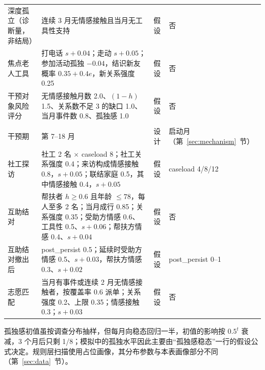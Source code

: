 \documentclass[10.5pt,twocolumn]{ctexart}
\begin{document}
\begin{table}[t]
\begin{tabular}{@{}>{\raggedright\arraybackslash}p{}>{\raggedright\arraybackslash}p{}>{\raggedright\arraybackslash}p{}>{\raggedright\arraybackslash}p{}@{}}
深度孤立（诊断量，非结局） & 连续 3 月无情感接触且当月无工具性支持 & 假设 & 否 \\
焦点老人工具 & 打电话 $s{+}0.04$；走动 $s{+}0.05$；参加活动孤独 $-0.04$，结识新友概率 $0.35+0.4e$，新关系强度 0.25 & 假设 & 否 \\
干预对象风险评分 & 无情感接触月数 2.0、$(1-h)$ 1.5、关系数不足 3 的缺口 1.0、当月事件数 0.8、孤独感 1.0 & 假设 & 否 \\
\midrule
\multicolumn{4}{@{}l}{\textit{干预（方向参照文献，数值为建模选择，见第~\ref{sec:interventions}~节）}} \\
干预期 & 第 7--18 月 & 设计 & 启动月（第~\ref{sec:mechanism}~节） \\
社工探访 & 社工 2 名 $\times$ caseload 8；社工关系强度 0.4；来访构成情感接触 0.8，$s{+}0.05$；联结家庭 0.5，其中情感接触 0.4，$s{+}0.05$ & 假设 & caseload 4/8/12 \\
互助结对 & 帮扶者 $h\ge0.6$ 且年龄 $\le78$，每人至多 2 名；当月成行 0.85；关系强度 0.35；受助方情感 0.6、工具性 0.5、$s{+}0.06$；帮扶方情感 0.4、$s{+}0.04$ & 假设 & 否 \\
互助结对撤出后 & post\_persist 0.5；延续时受助方情感 0.5、$s{+}0.03$，帮扶方情感 0.3、$s{+}0.02$ & 假设 & post\_persist 0--1 \\
志愿匹配 & 当月有事件或连续 2 月无情感接触者，按覆盖率 0.6 派单；关系强度 0.2、上限 0.35；情感接触 0.3；$s{+}0.03$ & 假设 & 否 \\
\bottomrule
\end{tabular}
\smallskip

{\footnotesize 孤独感初值虽按调查分布抽样，但每月向稳态回归一半，初值的影响按 $0.5^t$ 衰减，3 个月后只剩 1/8；模拟中的孤独水平因此主要由``孤独感稳态''一行的假设公式决定。规则层扫描使用占位画像，其分布参数与本表画像部分不同（第~\ref{sec:data}~节）。}
\end{table}
\end{document}
